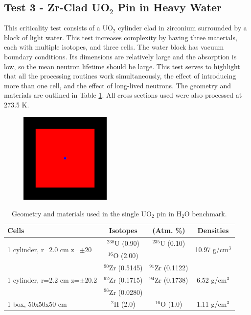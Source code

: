 \documentclass[preprint,12pt]{elsarticle}
\begin{document}
\newpage
\subsection{Test 3 - Zr-Clad UO$_2$ Pin in Heavy Water}

This criticality test consists of a UO$_2$ cylinder clad in zirconium surrounded by a block of light water.  This test increases complexity by having three materials, each with multiple isotopes, and three cells.  The water block has vacuum boundary conditions.  Its dimensions are relatively large and the absorption is low, so the mean neutron lifetime should be large.  This test serves to highlight that all the processing routines work simultaneously, the effect of introducing more than one cell, and the effect of long-lived neutrons.  The geometry and materials are outlined in Table \ref{uo2_pincell_geom}.  All cross sections used were also processed at 273.5 K.

\begin{figure}[h!] 
  \centering
    \includegraphics[width=0.4\textwidth]{graphics/pincell-xy.png}
     \caption{  \label{pincell_geom_pic} }
\end{figure}

\begin{table}[h]
\centering
\caption{Geometry and materials used in the single UO$_2$ pin in H$_2$O benchmark.}
\label{uo2_pincell_geom}
\begin{tabular}{| l | c  c | c |}
\hline
Cells & Isotopes & (Atm. \%)& Densities \\
\hline
\multirow{2}{*}{1 cylinder, r=2.0 cm z=$\pm$20 }  &   $^{238}$U   (0.90) &  $^{235}$U   (0.10) &  \multirow{2}{*}{10.97 g/cm$^3$} \\
                                                                              &   $^{16}$O    (2.00)  &                              &  \\
\hline
\multirow{3}{*}{1 cylinder, r=2.2 cm z=$\pm$20.2}  &   $^{90}$Zr   (0.5145) &  $^{91}$Zr   (0.1122)&  \multirow{3}{*}{6.52 g/cm$^3$} \\
                                                   &   $^{92}$Zr   (0.1715) &  $^{94}$Zr   (0.1738)& \\
                                                   &   $^{96}$Zr   (0.0280) &                      & \\
\hline
\multirow{1}{*}{1 box, 50x50x50 cm }  &    $^{2}$H   (2.0) & $^{16}$O   (1.0) &   \multirow{1}{*}{1.11 g/cm$^3$} \\
\hline
\end{tabular}
\end{table}
\end{document}
